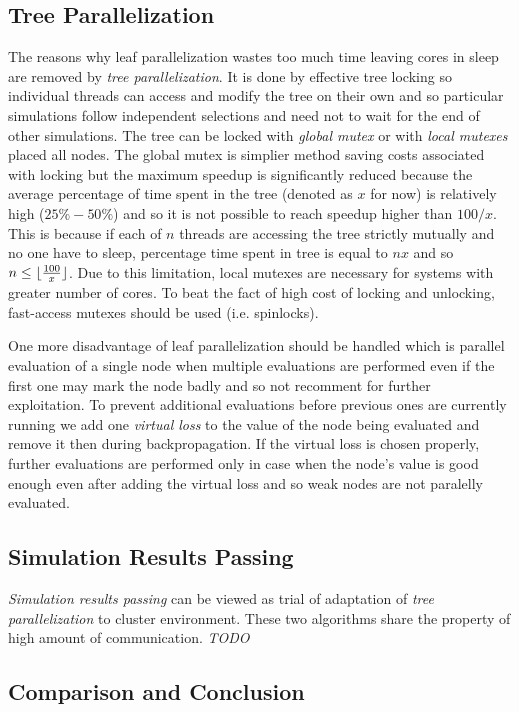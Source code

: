 \subsection{Tree Parallelization}

The reasons why leaf parallelization wastes too much time leaving cores in sleep are removed by
\emph{tree parallelization}. It is done by effective tree locking so individual threads can access
and modify the tree on their own and so particular simulations follow independent selections and
need not to wait for the end of other simulations. The tree can be locked with \emph{global mutex}
or with \emph{local mutexes} placed all nodes. The global mutex is simplier method saving costs
associated with locking but the maximum speedup is significantly reduced because the average
percentage of time spent in the tree (denoted as $x$ for now) is relatively high ($25\%-50\%$) and
so it is not possible to reach speedup higher than $100/x$. This is because if each of $n$ threads are
accessing the tree  strictly mutually and no one have to sleep, percentage time spent in tree is
equal to $n x$ and so $n \le \lfloor {100 \over{x}} \rfloor$. Due to this limitation, local mutexes
are necessary for systems with greater number of cores. To beat the fact of high cost of locking and
unlocking, fast-access mutexes should be used (i.e. spinlocks).

One more disadvantage of leaf parallelization should be handled which is parallel evaluation of a
single node when multiple evaluations are performed even if the first one may mark the node badly
and so not recomment for further exploitation. To prevent additional evaluations before previous
ones are currently running we add one \emph{virtual loss} to the value of the node being evaluated
and remove it then during backpropagation.
If the virtual loss is chosen properly, further evaluations are performed only in case when the
node's value is good enough even after adding the virtual loss and so weak nodes are not paralelly
evaluated.

\subsection{Simulation Results Passing}

\emph{Simulation results passing} can be viewed as trial of adaptation of \emph{tree
parallelization} to cluster environment. These two algorithms share the property of high amount of
communication. \emph{TODO}




\subsection{Comparison and Conclusion}









